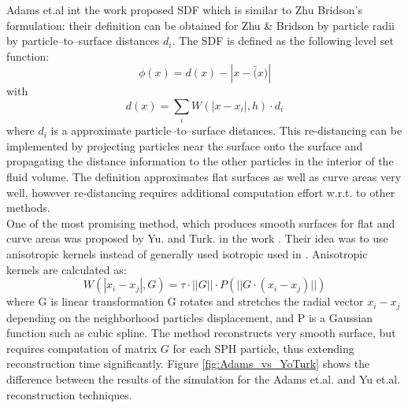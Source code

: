Adams et.al int the work \cite{AdamsEtAl} proposed SDF which is similar to Zhu Bridson's formulation: their definition can be obtained for Zhu \& Bridson by particle radii by particle–to–surface distances $d_i$. The SDF is defined as the following level set function:
\begin{equation}
	\phi(x) = d(x) - |x - \bar(x)|
\end{equation}
with
\begin{equation}
	d(x) = \sum_i W(|x - x_i|,h)\cdot d_i
\end{equation}
where $d_i$ is a approximate particle–to–surface distances. This re-distancing can be implemented by projecting particles near the surface onto the surface and propagating the distance information to the other particles in the interior of the fluid volume. The definition approximates flat surfaces as well as curve areas very well, however re-distancing requires additional computation effort w.r.t. to other methods.\\
One of the most promising method, which produces smooth surfaces for flat and curve areas was proposed by Yu. and Turk. in the work \cite{YuTurk}. Their idea was to use anisotropic kernels instead of generally used isotropic used in \cite{Muller}. Anisotropic kernels are calculated as:
\begin{equation}
	W(|x_i - x_j|, G) = \tau \cdot  ||G|| \cdot P(||G \cdot (x_i - x_j)||)
\end{equation}
where G is linear transformation G rotates and stretches the radial vector $x_i - x_j$ depending on the neighborhood particles displacement, and P is a Gaussian function such as cubic spline. The method reconstructs very smooth surface, but requires computation of matrix $G$ for each SPH particle, thus extending reconstruction time significantly. Figure \ref{fig:Adams_vs_YoTurk} shows the difference between the results of the simulation for the Adams et.al. and Yu et.al. reconstruction techniques.

